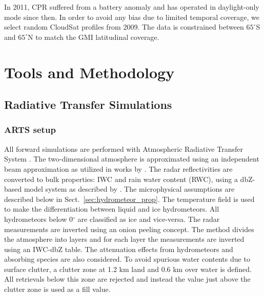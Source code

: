 \documentclass[amt, manuscript]{copernicus}
\begin{document}
In 2011, CPR suffered from a battery anomaly and has operated in daylight-only mode since then. In order to avoid any bias due to limited temporal coverage, we select random CloudSat profiles from 2009. The data is constrained between $65^{\circ}$S and $65^{\circ}$N to match the GMI latitudinal coverage. 


\section{Tools and Methodology}

\subsection{Radiative Transfer Simulations}
\label{sec:rt_simulations}

\subsubsection{ARTS setup}
\label{sec:arts_setup}
All forward simulations are performed with Atmospheric Radiative Transfer System \citep{eriksson:arts2:11}. The two-dimensional atmosphere is approximated using an independent beam approximation as utilized in works by \citet{ekelund2020using, eriksson:towar:20}. 
The radar reflectivities are converted to bulk properties: IWC and rain water content (RWC), using a dbZ-based model system as described by \citet{ekelund2020using}. The microphysical assumptions are described below in Sect.~\ref{sec:hydrometeor_prop}. The temperature field is used to make the differentiation between liquid and ice hydrometeors. All hydrometeors below 0$^{\circ}$ are classified as ice and vice-versa. The radar measurements are inverted using an onion peeling concept. The method  divides the atmosphere into layers and for each layer the measurements are inverted using an IWC-dbZ table. The attenuation effects from hydrometeors and absorbing species are also considered. To avoid spurious water contents due to surface clutter, a clutter zone at 1.2\,\,km land and 0.6\,\,km over water is defined. All retrievals below this zone are rejected and instead the value just above the clutter zone is used as a fill value. 


\end{document}
